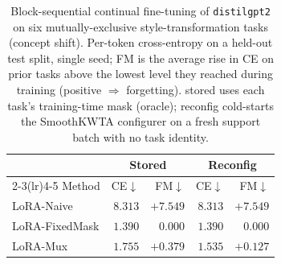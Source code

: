 \begin{table}[t]
\caption{Block-sequential continual fine-tuning of {\tt distilgpt2} on six mutually-exclusive style-transformation tasks (concept shift). Per-token cross-entropy on a held-out test split, single seed; FM is the average rise in CE on prior tasks above the lowest level they reached during training (positive $\Rightarrow$ forgetting). {\sc stored} uses each task's training-time mask (oracle); {\sc reconfig} cold-starts the SmoothKWTA configurer on a fresh support batch with no task identity.}
\label{tab:lora_styles}
\vskip 0.05in
\begin{center}\begin{small}\begin{sc}
\begin{tabular}{lrrrr}
\toprule
 & \multicolumn{2}{c}{Stored} & \multicolumn{2}{c}{Reconfig} \\
\cmidrule(lr){2-3}\cmidrule(lr){4-5}
Method & CE$\downarrow$ & FM$\downarrow$ & CE$\downarrow$ & FM$\downarrow$ \\
\midrule
LoRA-Naive & $8.313$ & $+7.549$ & $8.313$ & $+7.549$ \\
LoRA-FixedMask & $1.390$ & $0.000$ & $1.390$ & $0.000$ \\
LoRA-Mux & $1.755$ & $+0.379$ & $1.535$ & $+0.127$ \\
\bottomrule
\end{tabular}
\end{sc}\end{small}\end{center}
\vskip -0.1in
\end{table}
